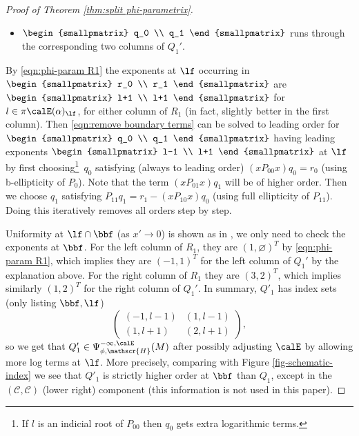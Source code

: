 \begin{proof}[Proof of Theorem \ref{thm:split phi-parametrix}]
\begin{itemize}
\item $\begin{smallpmatrix} q_0 \\ q_1 \end{smallpmatrix}$ runs through the corresponding two columns of $Q_1'$.
\end{itemize}
By \eqref{eqn:phi-param R1} the exponents at $\lf$ occurring in $\begin{smallpmatrix}
r_0 \\
r_1
\end{smallpmatrix}
$ are $\begin{smallpmatrix}
l+1 \\
l+1
\end{smallpmatrix}
$
for $l\in\pi\calE(\alpha)_\lf$, for either column of $R_1$ (in fact, slightly better in the first column). Then \eqref{eqn:remove boundary terms}
can be solved to leading order for $\begin{smallpmatrix}
q_0 \\
q_1
\end{smallpmatrix}
$ having leading exponents
$\begin{smallpmatrix}
l-1 \\
l+1
\end{smallpmatrix}
$
at $\lf$
by first choosing\footnote{If $l$ is an indicial root of $P_{00}$ then $q_0$ gets extra logarithmic terms.}~$q_0$ satisfying (always to leading order) $(xP_{00}x)q_0=r_0$ (using b-ellipticity of $P_{0}$).
Note that the term $(xP_{01}x)q_1$ will be of higher order. Then we choose $q_1$ satisfying
$P_{11} q_1 = r_1 - (xP_{10}x)q_0$ (using full ellipticity of $P_{11}$).
Doing this iteratively removes all orders step by step.

Uniformity at $\lf\cap\bbf$ (as $x'\to 0$) is shown as in \cite[Lem.\,5.44]{melrose1993atiyah}, we only need to check the exponents at $\bbf$. For the left column of $R_1$, they are $(1,\varnothing)^T$ by \eqref{eqn:phi-param R1}, which implies they are $(-1,1)^T$ for the left column of $Q_1'$ by the explanation above. For the right column of $R_1$ they are $(3,2)^T$, which implies similarly $(1,2)^T$ for the right column of $Q_1'$. In summary, $Q'_1$ has index sets (only listing $\bbf,\lf$)
\[
\begin{pmatrix}
(-1,l-1) & (1,l-1) \\
(1,l+1) & (2,l+1)
\end{pmatrix},
\]
so we get
that $Q'_1\in\Psi^{-\infty,\calE}_{\phi, \mathscr{H}}(M)$ after possibly adjusting $\calE$ by allowing more log terms at $\lf$.
More precisely, comparing with Figure \ref{fig-schematic-index} we see that
$Q'_1$ is strictly higher order at $\bbf$ than $Q_1$, except in the $(\mathscr{C},\mathscr{C})$ (lower right) component
(this information is not used in this paper).


\end{proof}
